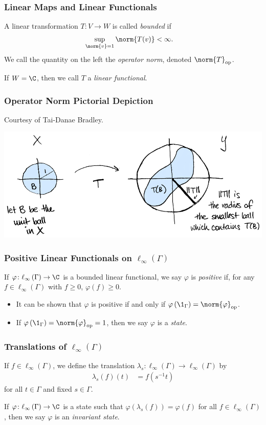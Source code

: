 \documentclass{beamer-custom}
\DeclareMathOperator{\op}{op}
\begin{document}
\begin{frame}
  \frametitle{Linear Maps and Linear Functionals}
  A linear transformation $T\colon V\rightarrow W$ is called \textit{bounded} if
  \begin{align*}
    \sup_{\norm{v}=1}\norm{T(v)} &< \infty.
  \end{align*}\pause
  We call the quantity on the left the \textit{operator norm}, denoted $\norm{T}_{\op}$.\newline

  If $W = \C$, then we call $T$ a \textit{linear functional}.
\end{frame}
\begin{frame}
  \frametitle{Operator Norm Pictorial Depiction}
  Courtesy of Tai-Danae Bradley.
  \begin{center}
    \includegraphics{images/operator_norm_depiction.png}
  \end{center}
\end{frame}
\begin{frame}
  \frametitle{Positive Linear Functionals on $\ell_{\infty}\left( \Gamma \right)$}
  If $\varphi\colon \ell_{\infty}\left( \Gamma \right)\rightarrow \C$ is a bounded linear functional, we say $\varphi $ is \textit{positive} if, for any $f\in \ell_{\infty}\left( \Gamma \right)$ with $f \geq 0$, $\varphi(f)\geq 0$.
  \begin{itemize}
    \item It can be shown that $\varphi$ is positive if and only if $\varphi\left( \1_{\Gamma} \right) = \norm{\varphi}_{\op}$.\pause
    \item If $\varphi\left( \1_{\Gamma} \right) = \norm{\varphi}_{\op} = 1$, then we say $\varphi$ is a \textit{state}.
  \end{itemize}
\end{frame}
\begin{frame}
  \frametitle{Translations of $\ell_{\infty}\left( \Gamma \right)$}
  If $f\in \ell_{\infty}\left( \Gamma \right)$, we define the translation $\lambda_s\colon \ell_{\infty}\left( \Gamma \right)\rightarrow \ell_{\infty}\left( \Gamma \right)$ by
  \begin{align*}
    \lambda_s(f)(t) &= f\left( s^{-1}t \right)
  \end{align*}
  for all $t\in \Gamma$ and fixed $s\in\Gamma$.\pause\newline

  If $\varphi\colon \ell_{\infty}\left( \Gamma \right)\rightarrow \C$ is a state such that $\varphi\left( \lambda_s(f) \right) = \varphi(f)$ for all $f\in \ell_{\infty}\left( \Gamma \right)$, then we say $\varphi$ is an \textit{invariant state}.
\end{frame}
\end{document}
